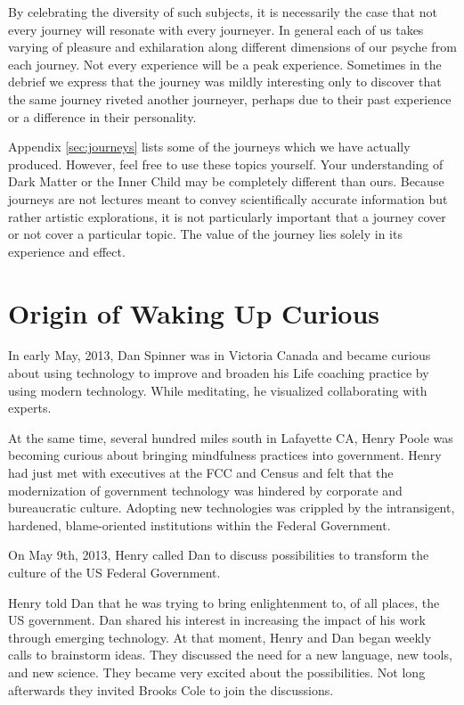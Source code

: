 \documentclass[12pt]{book}
\begin{document}
By celebrating the diversity of such subjects, it is necessarily the case that not every journey will resonate with every journeyer. In general each of us takes varying of pleasure and exhilaration along different dimensions of our psyche from each journey. Not every experience will be a peak experience. Sometimes in the debrief we express that the journey was mildly interesting only to discover that the same journey riveted another journeyer, perhaps due to their past experience or a difference in their personality.
					



Appendix \ref{sec:journeys} lists some of the journeys which we have actually produced. However, feel free to use these topics yourself. Your understanding of Dark Matter or the Inner Child may be completely different than ours. Because journeys are not lectures meant to convey scientifically accurate information but rather artistic explorations, it is not particularly important that a journey cover or not cover a particular topic. The value of the journey lies solely in its experience and effect.

\chapter{Origin of Waking Up Curious}

In early May, 2013, Dan Spinner was in Victoria Canada and became curious about using technology to improve and broaden his Life coaching practice by using modern technology. While meditating, he visualized collaborating with experts.
					
At the same time, several hundred miles south in Lafayette CA, Henry Poole was becoming curious about bringing mindfulness practices into government. Henry had just met with executives at the FCC and Census and felt that the modernization of government technology was hindered by corporate and bureaucratic culture. Adopting new technologies was crippled by the intransigent, hardened, blame-oriented institutions within the Federal Government.
					
On May 9th, 2013, Henry called Dan to discuss possibilities to transform the culture of the US Federal Government.
					
Henry told Dan that he was trying to bring enlightenment to, of all places, the US government. Dan shared his interest in increasing the impact of his work through emerging technology. At that moment, Henry and Dan began weekly calls to brainstorm ideas. They discussed the need for a new language, new tools, and new science. They became very excited about the possibilities. Not long afterwards they invited Brooks Cole to join the discussions.
					
\end{document}
